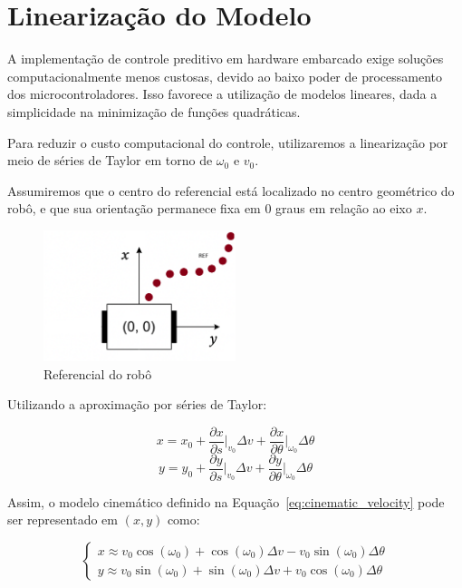 \section{Linearização do Modelo}

A implementação de controle preditivo em hardware embarcado 
exige soluções computacionalmente menos custosas, 
devido ao baixo poder de processamento dos microcontroladores. 
Isso favorece a utilização de modelos lineares, dada a simplicidade 
na minimização de funções quadráticas.

\vspace{1em}
Para reduzir o custo computacional do controle, 
utilizaremos a linearização por meio de séries de Taylor 
em torno de $\omega_0$ e $v_0$.

\vspace{1em}
Assumiremos que o centro do referencial está localizado no 
centro geométrico do robô, e que sua orientação permanece 
fixa em 0 graus em relação ao eixo $x$.

\begin{figure}[h]
    \centering
    \includegraphics[width=0.5\textwidth]{figures/robot_reference.png}
    \caption{Referencial do robô}
    \label{fig:robot_reference}
\end{figure}

Utilizando a aproximação por séries de Taylor:

\[
x = x_0 + \frac{\partial x}{\partial s} \bigg|_{v_0} \Delta v + \frac{\partial x}{\partial \theta} \bigg|_{\omega_0} \Delta \theta
\]
\[
y = y_0 + \frac{\partial y}{\partial s} \bigg|_{v_0} \Delta v + \frac{\partial y}{\partial \theta} \bigg|_{\omega_0} \Delta \theta
\]

Assim, o modelo cinemático definido na Equação~\ref{eq:cinematic_velocity} 
pode ser representado em $(x, y)$ como:

\begin{equation}
\begin{cases}
x \approx v_0 \cos(\omega_0) + \cos(\omega_0) \Delta v - v_0 \sin(\omega_0) \Delta \theta \\
y \approx v_0 \sin(\omega_0) + \sin(\omega_0) \Delta v + v_0 \cos(\omega_0) \Delta \theta
\end{cases}
\end{equation}

